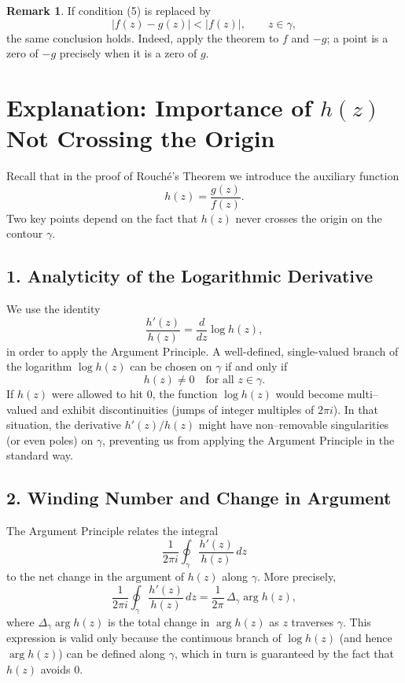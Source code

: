 \documentclass[12pt]{article}
\theoremstyle{definition} %
\newtheorem{remark}{Remark}
\theoremstyle{plain} %
\begin{document}
\begin{remark}
    If condition (5) is replaced by 
    \[
        |f(z)-g(z)|<|f(z)|,\qquad z\in\gamma, \tag{6}
    \]
    the same conclusion holds.  
    Indeed, apply the theorem to $f$ and $-g$; a point is a zero of $-g$
    precisely when it is a zero of $g$.
\end{remark}


\section*{Explanation: Importance of $h(z)$ Not Crossing the Origin}

Recall that in the proof of Rouché's Theorem we introduce the auxiliary function 
\[
  h(z) = \frac{g(z)}{f(z)}.
\]
Two key points depend on the fact that $h(z)$ never crosses the origin on the contour $\gamma$.

\subsection*{1. Analyticity of the Logarithmic Derivative}
We use the identity
\[
  \frac{h'(z)}{h(z)} = \frac{d}{dz}\log h(z),
\]
in order to apply the Argument Principle. A well-defined, single-valued branch of the logarithm $\log h(z)$ can be chosen on $\gamma$ if and only if 
\[
  h(z) \neq 0 \quad \text{for all } z\in\gamma.
\]
If $h(z)$ were allowed to hit $0$, the function $\log h(z)$ would become multi–valued and exhibit discontinuities (jumps of integer multiples of $2\pi i$). In that situation, the derivative $h'(z)/h(z)$ might have non–removable singularities (or even poles) on $\gamma$, preventing us from applying the Argument Principle in the standard way.

\subsection*{2. Winding Number and Change in Argument}
The Argument Principle relates the integral 
\[
  \frac{1}{2\pi i}\oint_{\gamma} \frac{h'(z)}{h(z)}\,dz 
\]
to the net change in the argument of $h(z)$ along $\gamma$. More precisely,
\[
  \frac{1}{2\pi i}\oint_{\gamma}\frac{h'(z)}{h(z)}\,dz
  = \frac{1}{2\pi} \, \Delta_{\gamma} \arg h(z),
\]
where $\Delta_{\gamma} \arg h(z)$ is the total change in $\arg h(z)$ as $z$ traverses $\gamma$. This expression is valid only because the continuous branch of $\log h(z)$ (and hence $\arg h(z)$) can be defined along $\gamma$, which in turn is guaranteed by the fact that $h(z)$ avoids $0$.
\end{document}
